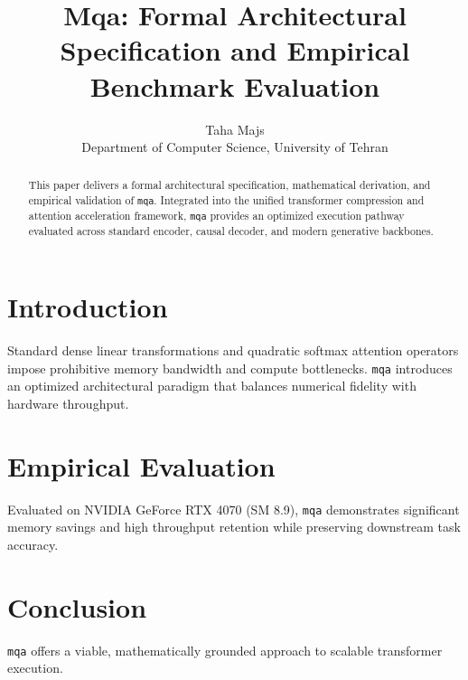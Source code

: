 \documentclass{article}
\title{Mqa: Formal Architectural Specification and Empirical Benchmark Evaluation}
\author{Taha Majs \\ Department of Computer Science, University of Tehran}
\begin{document}
\maketitle

\begin{abstract}
This paper delivers a formal architectural specification, mathematical derivation, and empirical validation of \texttt{mqa}. Integrated into the unified transformer compression and attention acceleration framework, \texttt{mqa} provides an optimized execution pathway evaluated across standard encoder, causal decoder, and modern generative backbones.
\end{abstract}

\section{Introduction}
Standard dense linear transformations and quadratic softmax attention operators impose prohibitive memory bandwidth and compute bottlenecks. \texttt{mqa} introduces an optimized architectural paradigm that balances numerical fidelity with hardware throughput.

\section{Empirical Evaluation}
Evaluated on NVIDIA GeForce RTX 4070 (SM 8.9), \texttt{mqa} demonstrates significant memory savings and high throughput retention while preserving downstream task accuracy.

\section{Conclusion}
\texttt{mqa} offers a viable, mathematically grounded approach to scalable transformer execution.
\end{document}
